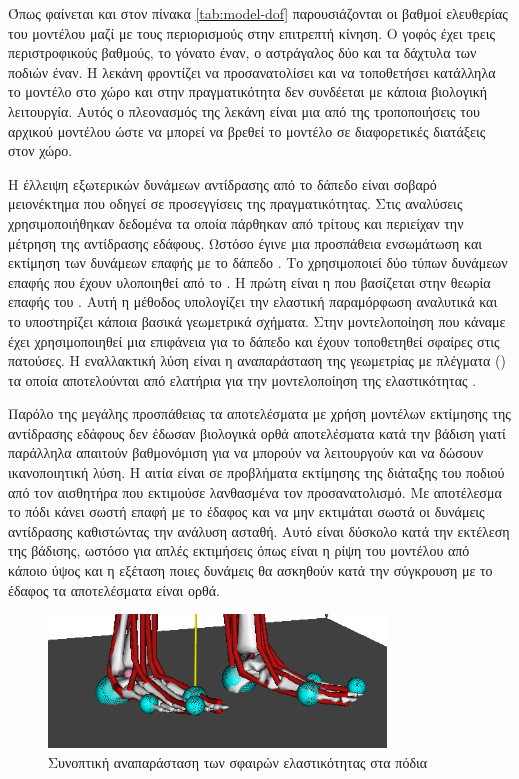 Όπως φαίνεται και στον πίνακα \ref{tab:model-dof} παρουσιάζονται οι βαθμοί ελευθερίας του μοντέλου μαζί με τους περιορισμούς στην επιτρεπτή κίνηση. Ο γοφός έχει τρεις περιστροφικούς βαθμούς, το γόνατο έναν, ο αστράγαλος δύο και τα δάχτυλα των ποδιών έναν. Η λεκάνη φροντίζει να προσανατολίσει και να τοποθετήσει κατάλληλα το μοντέλο στο χώρο και στην πραγματικότητα δεν συνδέεται με κάποια βιολογική λειτουργία. Αυτός ο πλεονασμός της λεκάνη είναι μια από της τροποποιήσεις του αρχικού μοντέλου ώστε να μπορεί να βρεθεί το μοντέλο σε διαφορετικές διατάξεις στον χώρο.

Η έλλειψη εξωτερικών δυνάμεων αντίδρασης από το δάπεδο είναι σοβαρό μειονέκτημα που οδηγεί σε προσεγγίσεις της πραγματικότητας. Στις αναλύσεις χρησιμοποιήθηκαν δεδομένα τα οποία πάρθηκαν από τρίτους και περιείχαν την μέτρηση της αντίδρασης εδάφους. Ωστόσο έγινε μια προσπάθεια ενσωμάτωση και εκτίμηση των δυνάμεων επαφής με το δάπεδο \cite{seitha11}. Το  χρησιμοποιεί δύο τύπων δυνάμεων επαφής που έχουν υλοποιηθεί από το . Η πρώτη είναι η  που βασίζεται στην θεωρία επαφής του  \cite{hunt75}. Αυτή η μέθοδος υπολογίζει την ελαστική παραμόρφωση αναλυτικά και το  υποστηρίζει κάποια βασικά γεωμετρικά σχήματα. Στην μοντελοποίηση που κάναμε έχει χρησιμοποιηθεί μια επιφάνεια για το δάπεδο και έχουν τοποθετηθεί σφαίρες στις πατούσες. Η εναλλακτική λύση είναι η αναπαράσταση της γεωμετρίας με πλέγματα () τα οποία αποτελούνται από ελατήρια για την μοντελοποίηση της ελαστικότητας \cite{hertz82}. 

Παρόλο της μεγάλης προσπάθειας τα αποτελέσματα με χρήση μοντέλων εκτίμησης της αντίδρασης εδάφους δεν έδωσαν βιολογικά ορθά αποτελέσματα κατά την βάδιση γιατί παράλληλα απαιτούν βαθμονόμιση για να μπορούν να λειτουργούν και να δώσουν ικανοποιητική λύση. Η αιτία είναι σε προβλήματα εκτίμησης της διάταξης του ποδιού από τον αισθητήρα που εκτιμούσε λανθασμένα τον προσανατολισμό. Με αποτέλεσμα το πόδι κάνει σωστή επαφή με το έδαφος και να μην εκτιμάται σωστά οι δυνάμεις αντίδρασης καθιστώντας την ανάλυση ασταθή. Αυτό είναι δύσκολο κατά την εκτέλεση της βάδισης, ωστόσο για απλές εκτιμήσεις όπως είναι η ρίψη του μοντέλου από κάποιο ύψος και η εξέταση ποιες δυνάμεις θα ασκηθούν κατά την σύγκρουση με το έδαφος τα αποτελέσματα είναι ορθά. 

\begin{figure}[H]
    \centering
    \includegraphics[width=0.8\textwidth, keepaspectratio]{fig/foot-contact.png}
    \caption{Συνοπτική αναπαράσταση των σφαιρών ελαστικότητας στα πόδια}
    \label{fig:foot-contact}
\end{figure}

